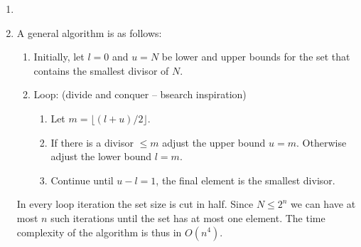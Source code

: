 \documentclass{article}
\begin{document}
\begin{enumerate}
    \item 

    \item A general algorithm is as follows:
    \begin{enumerate}[label=(\arabic*)]
        \item Initially, let $l = 0$ and $u = N$ be lower and upper bounds for the set that contains the smallest divisor of $N$.
        \item Loop: (divide and conquer -- bsearch inspiration)
        \begin{enumerate}
            \item Let $m = \lfloor(l + u)/2\rfloor$.
            \item If there is a divisor $\leq m$ adjust the upper bound $u = m$. Otherwise adjust the lower bound $l = m$.
            \item Continue until $u - l = 1$, the final element is the smallest divisor.
        \end{enumerate}
    \end{enumerate}
    In every loop iteration the set size is cut in half. Since $N \leq 2^{n}$ we can have at most $n$ such iterations until the set has at most one element. The time complexity of the algorithm is thus in $O(n^4)$. 
\end{enumerate}
\end{document}

